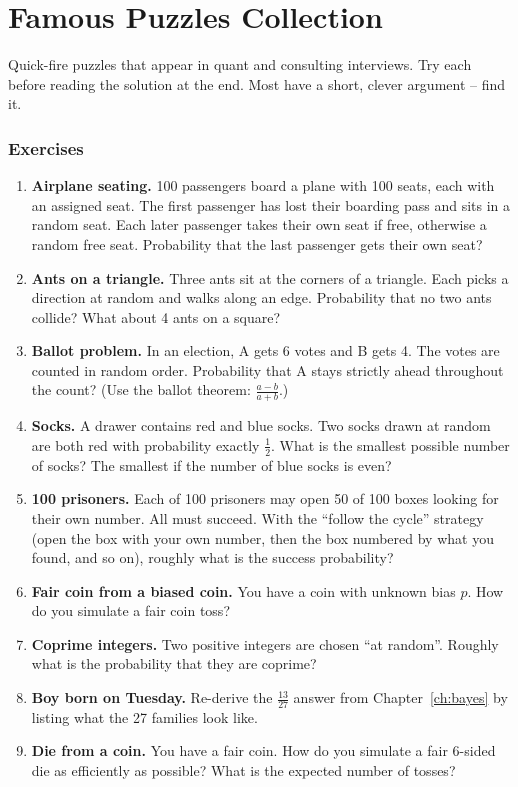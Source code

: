 \documentclass[11pt,a4paper,openany]{report}
\newenvironment{exercises}{\subsection*{Exercises \thechapter}\begin{enumerate}[label=\textbf{\thechapter.\arabic*},leftmargin=3.2em]}{\end{enumerate}}
\begin{document}
\chapter{Famous Puzzles Collection}\label{ch:famous}

Quick-fire puzzles that appear in quant and consulting interviews. Try each before reading the solution at the end. Most have a short, clever argument -- find it.

\begin{exercises}
\item \textbf{Airplane seating.} 100 passengers board a plane with 100 seats, each with an assigned seat. The first passenger has lost their boarding pass and sits in a random seat. Each later passenger takes their own seat if free, otherwise a random free seat. Probability that the last passenger gets their own seat?
\item \textbf{Ants on a triangle.} Three ants sit at the corners of a triangle. Each picks a direction at random and walks along an edge. Probability that no two ants collide? What about 4 ants on a square?
\item \textbf{Ballot problem.} In an election, A gets 6 votes and B gets 4. The votes are counted in random order. Probability that A stays strictly ahead throughout the count? (Use the ballot theorem: $\frac{a-b}{a+b}$.)
\item \textbf{Socks.} A drawer contains red and blue socks. Two socks drawn at random are both red with probability exactly $\frac12$. What is the smallest possible number of socks? The smallest if the number of blue socks is even?
\item \textbf{100 prisoners.} Each of 100 prisoners may open 50 of 100 boxes looking for their own number. All must succeed. With the ``follow the cycle'' strategy (open the box with your own number, then the box numbered by what you found, and so on), roughly what is the success probability?
\item \textbf{Fair coin from a biased coin.} You have a coin with unknown bias $p$. How do you simulate a fair coin toss?
\item \textbf{Coprime integers.} Two positive integers are chosen ``at random''. Roughly what is the probability that they are coprime?
\item \textbf{Boy born on Tuesday.} Re-derive the $\frac{13}{27}$ answer from Chapter~\ref{ch:bayes} by listing what the 27 families look like.
\item \textbf{Die from a coin.} You have a fair coin. How do you simulate a fair 6-sided die as efficiently as possible? What is the expected number of tosses?

\end{exercises}
\end{document}
